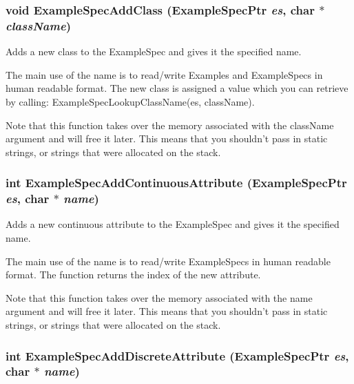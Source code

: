 \subsubsection{\setlength{\rightskip}{0pt plus 5cm}void Example\-Spec\-Add\-Class ({\bf Example\-Spec\-Ptr} {\em es}, char $\ast$ {\em class\-Name})}\label{ExampleSpec_8h_a26}


Adds a new class to the Example\-Spec and gives it the specified name. 

The main use of the name is to read/write Examples and Example\-Specs in human readable format. The new class is assigned a value which you can retrieve by calling: Example\-Spec\-Lookup\-Class\-Name(es, class\-Name).

Note that this function takes over the memory associated with the class\-Name argument and will free it later. This means that you shouldn't pass in static strings, or strings that were allocated on the stack. 
\subsubsection{\setlength{\rightskip}{0pt plus 5cm}int Example\-Spec\-Add\-Continuous\-Attribute ({\bf Example\-Spec\-Ptr} {\em es}, char $\ast$ {\em name})}\label{ExampleSpec_8h_a29}


Adds a new continuous attribute to the Example\-Spec and gives it the specified name. 

The main use of the name is to read/write Example\-Specs in human readable format. The function returns the index of the new attribute.

Note that this function takes over the memory associated with the name argument and will free it later. This means that you shouldn't pass in static strings, or strings that were allocated on the stack. 
\subsubsection{\setlength{\rightskip}{0pt plus 5cm}int Example\-Spec\-Add\-Discrete\-Attribute ({\bf Example\-Spec\-Ptr} {\em es}, char $\ast$ {\em name})}\label{ExampleSpec_8h_a28}


